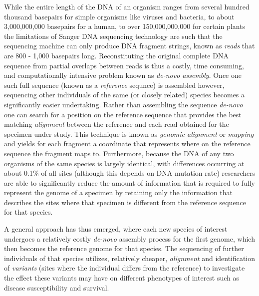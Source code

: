 While the entire length of the DNA of an organism ranges from several hundred thousand basepairs for simple organisms like viruses and bacteria, to about 3,000,000,000 basepairs for a human, to over 150,000,000,000 for certain plants\autocite{pellicer2010largest} the limitations of Sanger DNA sequencing technology are such that the sequencing machine can only produce DNA fragment strings, known as \emph{reads} that are 800 - 1,000 basepairs long\autocite{sanger1977dna}. Reconstituting the original complete DNA sequence from partial overlaps between reads is thus a costly, time consuming, and computationally intensive problem known as \emph{de-novo assembly}\autocite{zerbino2008velvet}. Once one such full sequence (known as a \emph{reference} sequnce) is assembled however, sequencing other individuals of the same (or closely related) species becomes a significantly easier undertaking. Rather than assembling the sequence \emph{de-novo} one can search for a position on the reference sequence that provides the best matching \emph{alignment} between the reference and each read obtained for the specimen under study. This technique is known as \emph{genomic alignment}\autocite{li2009fast} or \emph{mapping} and yields for each fragment a coordinate that represents where on the reference sequence the fragment maps to. Furthermore, because the DNA of any two organisms of the same species is largely identical, with differences occurring at about 0.1\% of all sites (although this depends on DNA mutation rate)\autocite{nachman2001single} researchers are able to significantly reduce the amount of information that is required to fully represent the genome of a specimen by retaining only the information that describes the sites where that specimen is different from the reference sequence for that species. 

A general approach has thus emerged, where each new species of interest undergoes a relatively costly \emph{de-novo} assembly process for the first genome, which then becomes the reference genome for that species. The sequencing of further individuals of that species utilizes, relatively cheaper, \emph{alignment} and identification of \emph{variants} (sites where the individual differs from the reference) to investigate the effect these variants may have on different phenotypes of interest such as disease susceptibility and survival\autocite{manolio2010genomewide}.

